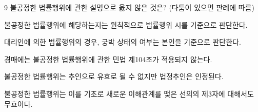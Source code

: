 \begin{question}{9}
불공정한 법률행위에 관한 설명으로 옳지 않은 것은? (다툼이 있으면 판례에 따름)
\begin{choices}
  \item 불공정한 법률행위에 해당하는지는 원칙적으로 법률행위 시를 기준으로 판단한다.
  \item 대리인에 의한 법률행위의 경우, 궁박 상태의 여부는 본인을 기준으로 판단한다.
  \item 경매에는 불공정한 법률행위에 관한 민법 제104조가 적용되지 않는다.
  \item 불공정한 법률행위는 추인으로 유효로 될 수 없지만 법정추인은 인정된다.
  \item 불공정한 법률행위는 이를 기초로 새로운 이해관계를 맺은 선의의 제3자에 대해서도 무효이다.
\end{choices}
\end{question}
